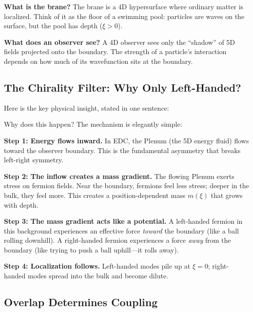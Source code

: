 \textbf{What is the brane?} The brane is a 4D hypersurface where ordinary matter
is localized. Think of it as the floor of a swimming pool: particles are waves
on the surface, but the pool has depth ($\xi > 0$).

\textbf{What does an observer see?} A 4D observer sees only the ``shadow'' of
5D fields projected onto the boundary. The strength of a particle's interaction
depends on how much of its wavefunction sits at the boundary.


\subsection{The Chirality Filter: Why Only Left-Handed?}

Here is the key physical insight, stated in one sentence:

\begin{center}
\end{center}

Why does this happen? The mechanism is elegantly simple:

\textbf{Step 1: Energy flows inward.} In EDC, the Plenum (the 5D energy fluid)
flows toward the observer boundary. This is the fundamental asymmetry that
breaks left-right symmetry.

\textbf{Step 2: The inflow creates a mass gradient.} The flowing Plenum exerts
stress on fermion fields. Near the boundary, fermions feel less stress; deeper
in the bulk, they feel more. This creates a position-dependent mass $m(\xi)$ that
grows with depth.

\textbf{Step 3: The mass gradient acts like a potential.} A left-handed fermion
in this background experiences an effective force \emph{toward} the boundary
(like a ball rolling downhill). A right-handed fermion experiences a force
\emph{away} from the boundary (like trying to push a ball uphill---it rolls away).

\textbf{Step 4: Localization follows.} Left-handed modes pile up at $\xi = 0$;
right-handed modes spread into the bulk and become dilute.


\subsection{Overlap Determines Coupling}

